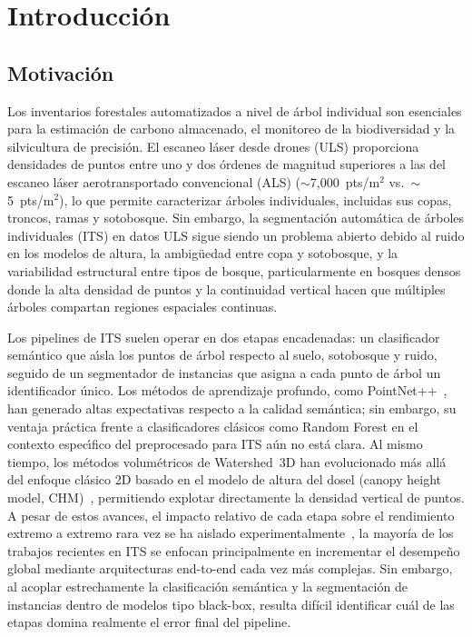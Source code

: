 \documentclass[runningheads]{llncs}
\begin{document}
\section{Introducci\'on}\label{sec:intro}

\subsection{Motivaci\'on}

Los inventarios forestales automatizados a nivel de \'arbol individual son esenciales para la estimaci\'on de carbono almacenado, el monitoreo de la biodiversidad y la silvicultura de precisi\'on. El escaneo l\'aser desde drones (ULS) proporciona densidades de puntos entre uno y dos \'ordenes de magnitud superiores a las del escaneo l\'aser aerotransportado convencional (ALS) ($\sim$7{,}000~pts/m$^2$ vs.\ $\sim$5~pts/m$^2$), lo que permite caracterizar \'arboles individuales, incluidas sus copas, troncos, ramas y sotobosque. Sin embargo, la segmentaci\'on autom\'atica de \'arboles individuales (ITS) en datos ULS sigue siendo un problema abierto debido al ruido en los modelos de altura, la ambig\"uedad entre copa y sotobosque, y la variabilidad estructural entre tipos de bosque, particularmente en bosques densos donde la alta densidad de puntos y la continuidad vertical hacen que múltiples árboles compartan regiones espaciales continuas.



Los pipelines de ITS suelen operar en dos etapas encadenadas: un clasificador sem\'antico que a\'\i{}sla los puntos de \'arbol respecto al suelo, sotobosque y ruido, seguido de un segmentador de instancias que asigna a cada punto de \'arbol un identificador \'unico. Los m\'etodos de aprendizaje profundo, como PointNet++~\cite{qi2017}, han generado altas expectativas respecto a la calidad sem\'antica; sin embargo, su ventaja pr\'actica frente a clasificadores cl\'asicos como Random Forest en el contexto espec\'\i{}fico del preprocesado para ITS a\'un no est\'a clara. Al mismo tiempo, los m\'etodos volum\'etricos de Watershed~3D han evolucionado m\'as all\'a del enfoque cl\'asico 2D basado en el modelo de altura del dosel (canopy height model, CHM)~\cite{dalponte2016}, permitiendo explotar directamente la densidad vertical de puntos. A pesar de estos avances, el impacto relativo de cada etapa sobre el rendimiento extremo a extremo rara vez se ha aislado experimentalmente~\cite{qi2017,breiman2001,puliti2023}, la mayoría de los trabajos recientes en ITS se enfocan principalmente en incrementar el desempeño global mediante arquitecturas end-to-end cada vez más complejas. Sin embargo, al acoplar estrechamente la clasificación semántica y la segmentación de instancias dentro de modelos tipo black-box, resulta difícil identificar cuál de las etapas domina realmente el error final del pipeline.
\end{document}
